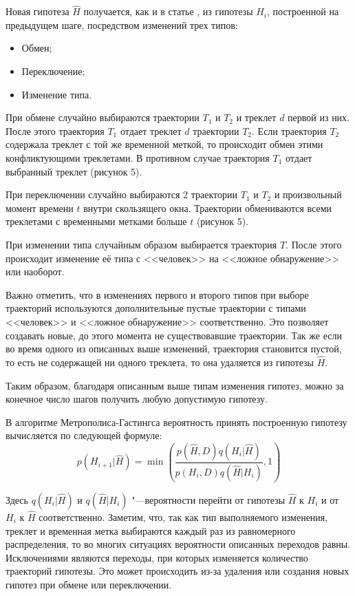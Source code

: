 Новая гипотеза $\hat{H}$ получается, как и в статье \cite{benfold2011stable}, из гипотезы $H_i$, построенной на предыдущем шаге, посредством изменений трех типов:
\begin{itemize}
	\item Обмен;
	\item Переключение;
	\item Изменение типа.
\end{itemize}
При обмене случайно выбираются траектории $T_1$ и $T_2$ и треклет $d$ первой из них. После этого траектория $T_1$ отдает треклет $d$ траектории $T_2$. Если траектория $T_2$ содержала треклет с той же временной меткой, то происходит обмен этими конфликтующими треклетами. В противном случае траектория $T_1$ отдает выбранный треклет (рисунок 5).

При переключении случайно выбираются 2 траектории $T_1$ и $T_2$ и произвольный момент времени $t$ внутри скользящего окна. Траектории обмениваются всеми треклетами с временными метками больше $t$ (рисунок 5).

При изменении типа случайным образом выбирается траектория $T$. После этого происходит изменение её типа с <<человек>> на <<ложное обнаружение>> или наоборот.

Важно отметить, что в изменениях первого и второго типов при выборе траекторий используются дополнительные пустые траектории с типами <<человек>> и <<ложное обнаружение>> соответственно. Это позволяет создавать новые, до этого момента не существовавшие траектории. Так же если во время одного из описанных выше изменений, траектория становится пустой, то есть не содержащей ни одного треклета, то она удаляется из гипотезы $\hat{H}$.


Таким образом, благодаря описанным выше типам изменения гипотез, можно за конечное число шагов получить любую допустимую гипотезу.

В алгоритме Метрополиса-Гастингса вероятность принять построенную гипотезу вычисляется по следующей формуле:
\begin{equation}
	p(H_{i+1}|\hat{H}) = \min \left(\frac{p(\hat{H}, D)q(H_i|\hat{H})}{p(H_i, D)q(\hat{H}|H_i)}, 1\right)
\end{equation}

Здесь $q(H_i|\hat{H})$ и $q(\hat{H}|H_i)$ "---вероятности перейти от гипотезы $\hat{H}$ к $H_i$ и от $H_i$ к $\hat{H}$ соответственно. Заметим, что, так как тип выполняемого изменения, треклет и временная метка выбираются каждый раз из равномерного распределения, то во многих ситуациях вероятности описанных переходов равны. Исключениями являются переходы, при которых изменяется количество траекторий гипотезы. Это может происходить из-за удаления или создания новых гипотез при обмене или переключении.

